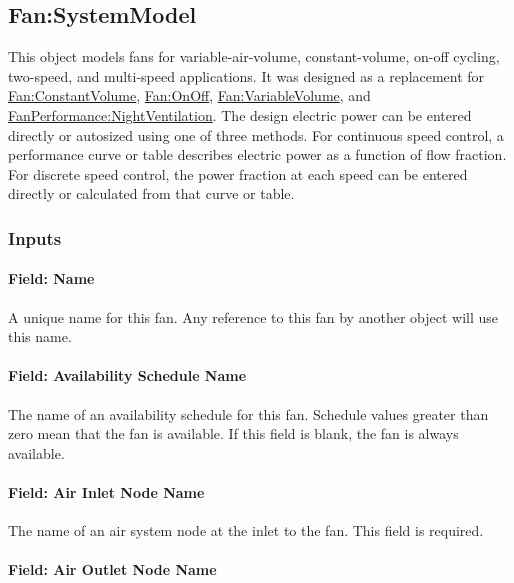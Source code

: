 \subsection{Fan:SystemModel}\label{fansystemmodel}

This object models fans for variable-air-volume, constant-volume, on-off cycling, two-speed, and multi-speed applications. It was designed as a replacement for \hyperref[fanconstantvolume]{Fan:ConstantVolume}, \hyperref[fanonoff]{Fan:OnOff}, \hyperref[fanvariablevolume]{Fan:VariableVolume}, and \hyperref[fanperformancenightventilation]{FanPerformance:NightVentilation}. The design electric power can be entered directly or autosized using one of three methods. For continuous speed control, a performance curve or table describes electric power as a function of flow fraction. For discrete speed control, the power fraction at each speed can be entered directly or calculated from that curve or table.

\subsubsection{Inputs}\label{inputs-fansysmodel}

\paragraph{Field: Name}\label{field-name-fansysmodel}

A unique name for this fan.  Any reference to this fan by another object will use this name.

\paragraph{Field: Availability Schedule Name}\label{field-availsched-fansysmodel}

The name of an availability schedule for this fan. Schedule values greater than zero mean that the fan is available. If this field is blank, the fan is always available.

\paragraph{Field: Air Inlet Node Name}\label{field-air-inlet-node-name-fansysmodel}

The name of an air system node at the inlet to the fan. This field is required.

\paragraph{Field: Air Outlet Node Name}\label{field-air-outlet-node-name-fansysmodel}

